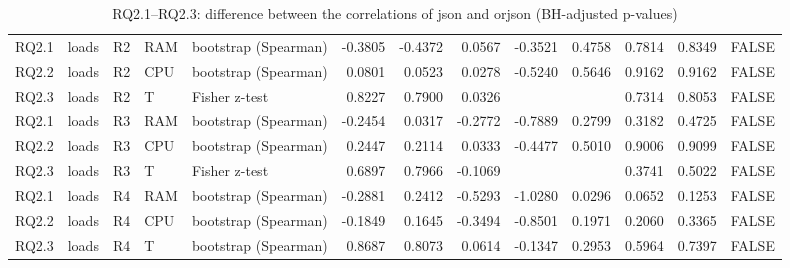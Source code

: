 \begin{table}[ht]
\begin{tabular}{lllllrrrrrrrl}
  RQ2.1 & loads & R2 & RAM & bootstrap (Spearman) & -0.3805 & -0.4372 & 0.0567 & -0.3521 & 0.4758 & 0.7814 & 0.8349 & FALSE \\ 
  RQ2.2 & loads & R2 & CPU & bootstrap (Spearman) & 0.0801 & 0.0523 & 0.0278 & -0.5240 & 0.5646 & 0.9162 & 0.9162 & FALSE \\ 
  RQ2.3 & loads & R2 & T & Fisher z-test & 0.8227 & 0.7900 & 0.0326 &  &  & 0.7314 & 0.8053 & FALSE \\ 
  RQ2.1 & loads & R3 & RAM & bootstrap (Spearman) & -0.2454 & 0.0317 & -0.2772 & -0.7889 & 0.2799 & 0.3182 & 0.4725 & FALSE \\ 
  RQ2.2 & loads & R3 & CPU & bootstrap (Spearman) & 0.2447 & 0.2114 & 0.0333 & -0.4477 & 0.5010 & 0.9006 & 0.9099 & FALSE \\ 
  RQ2.3 & loads & R3 & T & Fisher z-test & 0.6897 & 0.7966 & -0.1069 &  &  & 0.3741 & 0.5022 & FALSE \\ 
  RQ2.1 & loads & R4 & RAM & bootstrap (Spearman) & -0.2881 & 0.2412 & -0.5293 & -1.0280 & 0.0296 & 0.0652 & 0.1253 & FALSE \\ 
  RQ2.2 & loads & R4 & CPU & bootstrap (Spearman) & -0.1849 & 0.1645 & -0.3494 & -0.8501 & 0.1971 & 0.2060 & 0.3365 & FALSE \\ 
  RQ2.3 & loads & R4 & T & bootstrap (Spearman) & 0.8687 & 0.8073 & 0.0614 & -0.1347 & 0.2953 & 0.5964 & 0.7397 & FALSE \\ 
   \bottomrule
\end{tabular}
\caption{RQ2.1--RQ2.3: difference between the correlations of json and orjson (BH-adjusted p-values)} 
\label{tab:rq2_corr_diff}
\end{table}
